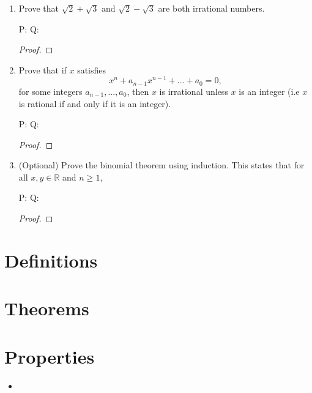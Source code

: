 \documentclass{article} %
\theoremstyle{plain}
\newtheorem*{theorem*}{Theorem}
\theoremstyle{definition}
\theoremstyle{case}
\begin{document}
\begin{enumerate}[label={\fbox{\textbf{Exercise \#\arabic* :}}}]
\begin{theorem*} Suppose $n$ is an integer. If $n^2$ is divisible by $3$, then $n$ is divisible by $3$. 

\end{theorem*}
\emph{(Hint: if $n$ is not divisible by $3$, then $n=3k+1$ or $n=3k+2$ for some integer $k$.)}

P: 
Q:

\begin{proof}
\end{proof} 

\newpage
\item Prove that $\sqrt{2}+\sqrt{3}$ and $\sqrt{2}-\sqrt{3}$ are both  irrational numbers.

P: 
Q:

\begin{proof}
\end{proof} 

\newpage
\item Prove that if $x$ satisfies 
  \[ x^n+a_{n-1}x^{n-1}+...+a_{0}=0, \]
  for some integers $a_{n-1},...,a_0$, then $x$ is irrational unless $x$ is an integer (i.e $x$ is rational if and only if it is an integer).

P: 
Q:

\begin{proof}
\end{proof} 

\newpage
\item (Optional) Prove the binomial theorem using induction. This states that for all $x,y \in \mathbb{R}$ and $n\geq 1$,


P: 
Q:

\begin{proof}
\end{proof} 

\newpage
\end{enumerate}

\newpage

\section*{Definitions}

\section*{Theorems}

\section*{Properties}
  \begin{itemize}
        \item
  \end{itemize}
\end{document}
